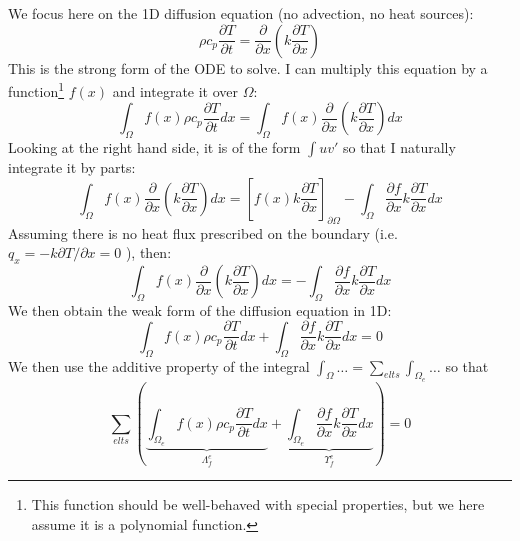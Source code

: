 We focus here on the 1D diffusion equation (no advection, no heat sources):
\begin{equation}
\rho c_p \frac{\partial T}{\partial t} 
= \frac{\partial }{\partial x} \left( k \frac{\partial T}{\partial x}  \right)
\end{equation}
This is the {\color{olive}strong form} of the ODE to solve.
I can multiply this equation by a function\footnote{This function should be well-behaved with special properties, but we here assume it is a polynomial function.} $f(x)$ and integrate it over $\Omega$:
\begin{equation}
\int_{\Omega} f(x)  \rho c_p\frac{\partial T}{\partial t} dx
=
\int_{\Omega} f(x) \frac{\partial }{\partial x} \left( k \frac{\partial T}{\partial x}  \right) dx
\end{equation}
Looking at the right hand side, it is of the form $\int u v'$ so that I naturally 
integrate it by parts:
\begin{equation}
\int_{\Omega} f(x) \frac{\partial }{\partial x} 
\left( k \frac{\partial T}{\partial x}  \right) dx
=
\left[
f(x) k \frac{\partial T}{\partial x}
\right]_{\partial \Omega}
-
\int_{\Omega} \frac{\partial f}{\partial x}  k \frac{\partial T}{\partial x}  dx
\end{equation}
Assuming there is no heat flux prescribed on the boundary (i.e. $q_x= - k \partial T/\partial x = 0$ ),
 then:
\begin{equation}
\int_{\Omega} f(x) \frac{\partial }{\partial x} \left( k \frac{\partial T}{\partial x}  \right) dx
=
- \int_{\Omega} \frac{\partial f}{\partial x}  k \frac{\partial T}{\partial x}  dx
\end{equation}
We then obtain the {\color{olive}weak form} of the diffusion equation in 1D:
\begin{equation}
\boxed{
\int_{\Omega} f(x) \rho c_p \frac{\partial T}{\partial t} dx
+
\int_{\Omega} \frac{\partial f}{\partial x}  k \frac{\partial T}{\partial x}  dx = 0
}
\end{equation}
We then use the additive property of the integral 
$\int_\Omega \dots = \sum_{elts} \int_{\Omega_e} \dots$
so that 
\begin{equation}
\sum_{elts} \left(     
\underbrace{ \int_{\Omega_e} f(x) \rho c_p   \frac{\partial T}{\partial t} dx }_{{\Lambda}_f^e}
+
\underbrace{\int_{\Omega_e} \frac{\partial f}{\partial x}  k \frac{\partial T}{\partial x}  dx}_{{\Upsilon}_f^e}      \right) = 0  
\end{equation}


